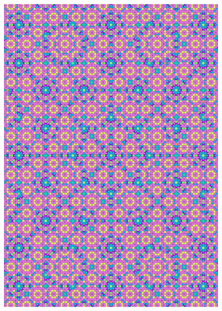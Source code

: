 \documentclass[text.tex]{subfiles}
\begin{document}
\begin{figure}[h!]
\centering
\includegraphics[width=1\textwidth]{img/results/circle8/quasi_circle_177893_(5033_-2084alpha_1).pdf}
\end{figure}
\end{document}
